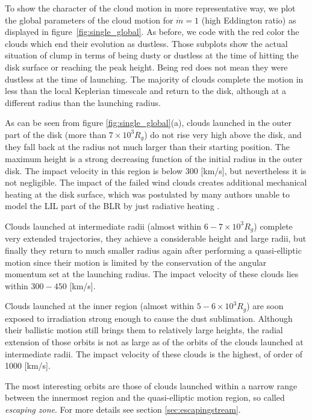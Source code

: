 \documentclass[twocolumn]{aastex62}
\begin{document}
To show the character of the cloud motion in more representative way, we plot the global parameters of the cloud motion for $\dot m = 1$ (high Eddington ratio) as displayed in figure~\ref{fig:single_global}. As before, we code with the red color the clouds which end their evolution as dustless.
Those subplots show the actual situation of clump in terms of being dusty or dustless at the time of hitting the disk surface or reaching the peak height. Being red does not mean they were dustless at the time of launching.
The majority of clouds complete the motion in less than the local Keplerian timescale and return to the disk, although at a different radius than the launching radius.

As can be seen from figure \ref{fig:single_global}(a), clouds launched in the outer part of the disk (more than $7 \times 10^3 R_g$) do not rise very high above the disk, and they fall back at the radius not much larger than their starting position. The maximum height is a strong decreasing function of the initial radius in the outer disk. The impact velocity in this region is below 300 [km/s], but nevertheless it is not negligible. The impact of the failed wind clouds creates additional mechanical heating at the disk surface, which was postulated by many authors unable to model the LIL part of the BLR by just radiative heating \citep[e.g.][]{joly1987, baldwin2004, panda2018, panda2020a}. 

Clouds launched at intermediate radii (almost within $6 - 7 \times 10^3 R_g$) complete very extended trajectories, they achieve a considerable height and large radii, but finally they return to much smaller radius again after performing a quasi-elliptic motion since their motion is limited by the conservation of the angular momentum set at the launching radius. The impact velocity of these clouds lies within $300-450$ [km/s].

Clouds launched at the inner region (almost within $5 - 6 \times 10^3 R_g$) are soon exposed to irradiation strong enough to cause the dust sublimation. Although their ballistic motion still brings them to relatively large heights, the radial extension of those orbits is not as large as of the orbits of the clouds launched at intermediate radii. The impact velocity of these clouds is the highest, of order of 1000 [km/s].

The most interesting orbits are those of clouds launched within a narrow range between the innermost region and the quasi-elliptic motion region, so called \emph{escaping zone}. For more details see section \ref{sec:escapingstream}.
\end{document}

